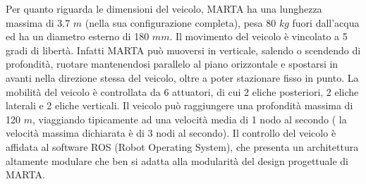 \documentclass[Lau,binding=0.6cm]{sapthesis}
\begin{document}
Per quanto riguarda le dimensioni del veicolo, MARTA ha una lunghezza massima di 3.7 $m$ (nella sua configurazione completa), pesa 80 $kg$ fuori dall'acqua ed  ha un diametro esterno di 180 $mm$. Il movimento del veicolo è vincolato a 5 gradi di libertà. Infatti MARTA può muoversi in verticale, salendo o scendendo di profondità, ruotare mantenendosi parallelo al piano orizzontale e spostarsi in avanti nella direzione stessa del veicolo, oltre a poter stazionare fisso in punto. La mobilità del veicolo è controllata da 6 attuatori, di cui 2 eliche posteriori, 2 eliche laterali e 2 eliche verticali. Il veicolo può raggiungere una profondità massima di 120 $m$, viaggiando tipicamente ad una velocità media di 1 nodo al secondo ( la velocità massima dichiarata è di 3 nodi al secondo). \newline 
Il controllo del veicolo è affidata al software ROS (Robot Operating System), che presenta un architettura altamente modulare che ben si adatta alla modularità del design progettuale di MARTA.
\end{document}

